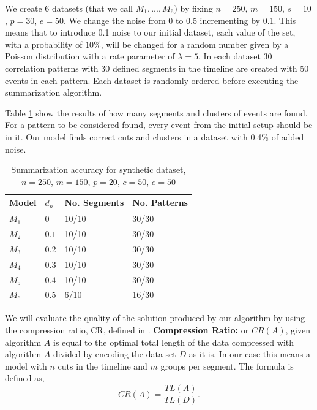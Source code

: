 We create 6 datasets (that we call $M_1, ..., M_6$) by fixing $n=250$, $m=150$, $s=10$, $p=30$, $e=50$. We change the noise from 0 to 0.5 incrementing by 0.1. This means that to introduce 0.1  noise  to our initial dataset, each value of the set, with a probability of $10\%$, will be changed for a random number given by a Poisson distribution with a rate parameter of $\lambda=5$. In each dataset 30 correlation patterns with 30 defined segments in the timeline are created with 50 events in each pattern. Each dataset is randomly ordered before executing the summarization algorithm.

Table \ref{tab:syn1000} show the results of how many segments and clusters of events are found. For a pattern to be considered found, every event from the initial setup should be in it. Our model finds correct cuts and clusters in a dataset with 0.4\% of added noise.

\begin{table}[!h]
\centering
    \caption{Summarization accuracy for synthetic dataset, $n=250$, $m=150$, $p=20$, $c=50$, $e=50$}     
    \label{tab:syn1000}
    \begin{small}
    \begin{tabular}{|l|l|l|l|}
    \hline
    {\bfseries Model} &{\bfseries $d_n$} & {\bfseries  No. Segments} &  {\bfseries  No. Patterns}     \\
    \hline
    $M_1$&$0$ &  10/10 & 30/30\\    \hline
     $M_2$&$0.1$ & 10/10  & 30/30\\    \hline
     $M_3$& $0.2$ & 10/10 & 30/30\\    \hline
     $M_4$  &$0.3$ & 10/10 & 30/30\\    \hline
     $M_5$  & $0.4$ & 10/10  & 30/30\\    \hline
     $M_6$  & $0.5$ & 6/10 & 16/30\\    \hline
    \end{tabular}
    \end{small} 
\end{table}

We will evaluate the quality of the solution produced by our algorithm by using the compression ratio, CR, defined in \cite{Kiernan:constructing}.
\textbf{Compression Ratio:} or $CR(A)$, given algorithm $A$  is equal to the optimal total length of the data compressed with algorithm $A$ divided by encoding the data set $D$ as it is. In our case this means a model with $n$ cuts in the timeline and $m$ groups per segment. The formula is defined as,
$$CR(A)=\frac{TL(A)}{TL(D)}.$$

